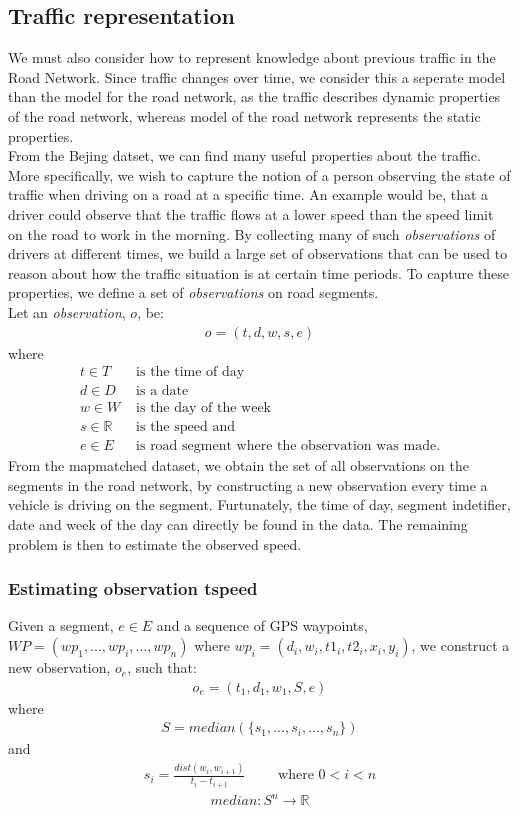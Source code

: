 \subsection{Traffic representation}\label{KR:traffic}
We must also consider how to represent knowledge about previous traffic in the Road Network. Since traffic changes over time, we consider this a seperate model than the model for the road network, as the traffic describes dynamic properties of the road network, whereas model of the road network represents the static properties.\\
From the Bejing datset, we can find many useful properties about the traffic. More specifically, we wish to capture the notion of a person observing the state of traffic when driving on a road at a specific time. An example would be, that a driver could observe that the traffic flows at a lower speed than the speed limit on the road to work in the morning. By collecting many of such \emph{observations} of drivers at different times, we build a large set of observations that can be used to reason about how the traffic situation is at certain time periods. To capture these properties, we define a set of \emph{observations} on road segments.\\
Let an \emph{observation}, $o$, be:
\begin{align*}
o = (t, d, w, s, e)
\end{align*}
where
\begin{align*}
t \in T &\text{ is the time of day} \\
d \in D &\text{ is a date} \\
w \in W &\text{ is the day of the week} \\
s \in \mathbb{R} &\text{ is the speed and}\\
e \in E &\text{ is road segment where the observation was made.}
\end{align*}
From the mapmatched dataset, we obtain the set of all observations on the segments in the road network, by constructing a new observation every time a vehicle is driving on the segment. Furtunately, the time of day, segment indetifier, date and week of the day can directly be found in the data. The remaining problem is then to estimate the observed speed.

\subsubsection{Estimating observation tspeed}\label{KR:speed}
Given a segment, $e \in E$ and a sequence of GPS waypoints, $WP=(wp_1,...,wp_i,...,wp_n)$ where $wp_i = (d_i, w_i, t1_i, t2_i, x_i, y_i)$, we construct a new observation, $o_e$, such that:
\begin{align*}
o_e = (t_1, d_1, w_1, S, e)
\end{align*}
where
\begin{align*}
S = median(\{s_1,...,s_i,...,s_n\})
\end{align*}
and
\begin{align*}
s_i = \frac{dist(w_i, w_{i+1})}{t_i - t_{i+1}} \qquad \text{ where } 0 < i < n
\end{align*}
\begin{align*}
median: S^n \rightarrow \mathbb{R}
\end{align*}
